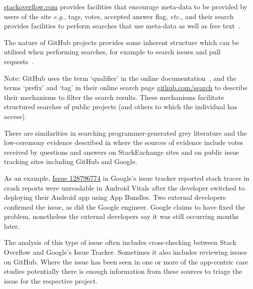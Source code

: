 \href{https://stackoverflow.com/}{stackoverflow.com} provides facilities that encourage meta-data to be provided by users of the site \textit{e.g.}, tags, votes, accepted answer flag, \textit{etc.}, and their search provides facilities to perform searches that use meta-data as well as free text~.

The nature of GitHub projects provides some inherent structure which can be utilised when performing searches, for example to search issues and pull requests~. 

\begin{kaobox}[frametitle=Inconsistent terms for searches on GitHub]
Note: GitHub uses the term `qualifier' in the online documentation~, and the terms `prefix' and `tag' in their online search page \href{https://github.com/search}{github.com/search} to describe their mechanisms to filter the search results. These mechanisms facilitate structured searches of public projects (and others to which the individual has access).
\end{kaobox}


There are similarities in searching programmer-generated grey literature and the low-ceremony evidence described in  where the sources of evidence include votes received by questions and answers on StackExchange sites and on public issue tracking sites including GitHub and Google. %

As an example, \href{https://issuetracker.google.com/issues/128796774}{Issue 128796774} in Google's issue tracker reported stack traces in crash reports were unreadable in Android Vitals after the developer switched to deploying their Android app using App Bundles. Two external developers confirmed the issue, as did the Google engineer. Google claims to have fixed the problem, nonetheless the external developers say it was still occurring months later.

The analysis of this type of issue often includes cross-checking between Stack Overflow and Google's Issue Tracker. Sometimes it also includes reviewing issues on GitHub. Where the issue has been seen in one or more of the app-centric case studies potentially there is enough information from these sources to triage the issue for the respective project.


